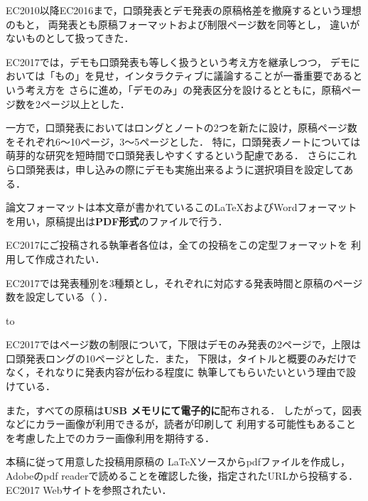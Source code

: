 EC2010以降EC2016まで，口頭発表とデモ発表の原稿格差を撤廃するという理想のもと，
両発表とも原稿フォーマットおよび制限ページ数を同等とし，
違いがないものとして扱ってきた．

EC2017では，デモも口頭発表も等しく扱うという考え方を継承しつつ，
デモにおいては「もの」を見せ，インタラクティブに議論することが一番重要であるという考え方を
さらに進め，「デモのみ」の発表区分を設けるとともに，原稿ページ数を2ページ以上とした．

一方で，口頭発表においてはロングとノートの2つを新たに設け，原稿ページ数をそれぞれ6〜10ページ，3〜5ページとした．
特に，口頭発表ノートについては萌芽的な研究を短時間で口頭発表しやすくするという配慮である．
さらにこれら口頭発表は，申し込みの際にデモも実施出来るように選択項目を設定してある．

論文フォーマットは本文章が書かれているこのLaTeXおよびWordフォーマット
を用い，原稿提出は\textbf{PDF形式}のファイルで行う．

EC2017にご投稿される執筆者各位は，全ての投稿をこの定型フォーマットを
利用して作成されたい．

EC2017では発表種別を3種類とし，それぞれに対応する発表時間と原稿のページ数を設定している（ ）．

\begin{table}[tb]
\caption{発表種別と発表時間，原稿ページ数}
\label{tab:presentation}
\hbox to
\end{table}



EC2017ではページ数の制限について，下限はデモのみ発表の2ページで，上限は
口頭発表ロングの10ページとした．また，
下限は，タイトルと概要のみだけでなく，それなりに発表内容が伝わる程度に
執筆してもらいたいという理由で設けている．

また，すべての原稿は\textbf{USB メモリにて電子的に}配布される．
したがって，図表などにカラー画像が利用できるが，読者が印刷して
利用する可能性もあることを考慮した上でのカラー画像利用を期待する．

本稿に従って用意した投稿用原稿の \LaTeX ソースからpdfファイルを作成し，
Adobeのpdf readerで読めることを確認した後，指定されたURLから投稿する．
EC2017 Webサイトを参照されたい．

